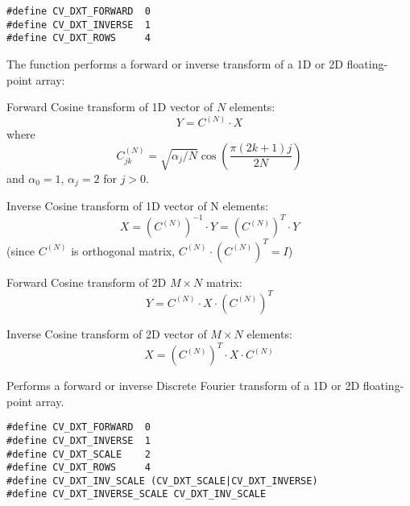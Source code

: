 \begin{lstlisting}
#define CV_DXT_FORWARD  0
#define CV_DXT_INVERSE  1
#define CV_DXT_ROWS     4
\end{lstlisting}

\begin{description}
\end{description}

The function performs a forward or inverse transform of a 1D or 2D floating-point array:

Forward Cosine transform of 1D vector of $N$ elements:
\[Y = C^{(N)} \cdot X\]
where
\[C^{(N)}_{jk}=\sqrt{\alpha_j/N}\cos\left(\frac{\pi(2k+1)j}{2N}\right)\]
and $\alpha_0=1$, $\alpha_j=2$ for $j > 0$.

Inverse Cosine transform of 1D vector of N elements:
\[X = \left(C^{(N)}\right)^{-1} \cdot Y = \left(C^{(N)}\right)^T \cdot Y\]
(since $C^{(N)}$ is orthogonal matrix, $C^{(N)} \cdot \left(C^{(N)}\right)^T = I$)

Forward Cosine transform of 2D $M \times N$ matrix:
\[Y = C^{(N)} \cdot X \cdot \left(C^{(N)}\right)^T\]

Inverse Cosine transform of 2D vector of $M \times N$ elements:
\[X = \left(C^{(N)}\right)^T \cdot X \cdot C^{(N)}\]


Performs a forward or inverse Discrete Fourier transform of a 1D or 2D floating-point array.


\begin{lstlisting}
#define CV_DXT_FORWARD  0
#define CV_DXT_INVERSE  1
#define CV_DXT_SCALE    2
#define CV_DXT_ROWS     4
#define CV_DXT_INV_SCALE (CV_DXT_SCALE|CV_DXT_INVERSE)
#define CV_DXT_INVERSE_SCALE CV_DXT_INV_SCALE
\end{lstlisting}

